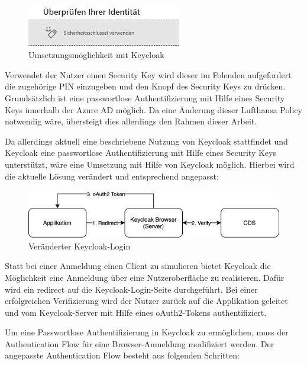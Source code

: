 \begin{figure}[h]
	\centering 
	\includegraphics[width=0.6\textwidth]{img/abbildungen/azure_seckey.png}
	\captionsetup{format=hang}
	\caption{Umsetzungsmöglichkeit mit Keycloak}
\end{figure}

Verwendet der Nutzer einen Security Key wird dieser im Folenden aufgefordert die zugehörige PIN einzugeben und den Knopf des Security Keys zu drücken. Grundsätzlich ist eine passwortlose Authentifizierung mit Hilfe eines Security Keys innerhalb der Azure \ac{AD} möglich. Da eine Änderung dieser Lufthansa Policy notwendig wäre, übersteigt dies allerdings den Rahmen dieser Arbeit.

Da allerdings aktuell eine beschriebene Nutzung von Keycloak stattfindet und Keycloak eine passwortlose Authentifizierung mit Hilfe eines Security Keys unterstützt, wäre eine Umsetzung mit Hilfe von Keycloak möglich. Hierbei wird die aktuelle Lösung verändert und entsprechend angepasst:

\begin{figure}[h]
	\centering 
	\includegraphics[width=1\textwidth]{img/abbildungen/keycloak_browser.png}
	\captionsetup{format=hang}
	\caption{Veränderter Keycloak-Login}
\end{figure}

Statt bei einer Anmeldung einen Client zu simulieren bietet Keycloak die Möglichkeit eine Anmeldung über eine Nutzeroberfläche zu realisieren. Dafür wird ein redirect auf die Keycloak-Login-Seite durchgeführt. Bei einer erfolgreichen Verifizierung wird der Nutzer zurück auf die Applikation geleitet und vom Keycloak-Server mit Hilfe eines oAuth2-Tokens authentifiziert. 

Um eine Passwortlose Authentifizierung in Keycloak zu ermöglichen, muss der Authentication Flow für eine Browser-Anmeldung modifiziert werden. Der angepasste Authentication Flow besteht aus folgenden Schritten:

